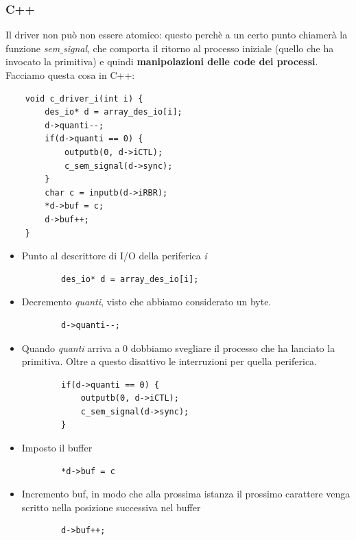 \subsubsection{C++} Il driver non può non essere atomico: questo perchè a un certo punto chiamerà la funzione \emph{sem$\_$signal}, che comporta il ritorno al processo iniziale (quello che ha invocato la primitiva) e quindi \textbf{manipolazioni delle code dei processi}. Facciamo questa cosa in C++:
\begin{verbatim}
	void c_driver_i(int i) {
		des_io* d = array_des_io[i];	
		d->quanti--;
		if(d->quanti == 0) {
			outputb(0, d->iCTL);
			c_sem_signal(d->sync);    
		}
		char c = inputb(d->iRBR);
		*d->buf = c;
		d->buf++;
	}
\end{verbatim}
\begin{itemize}
	\item Punto al descrittore di I/O della periferica \emph{i}
	\begin{verbatim}
		des_io* d = array_des_io[i]; 
	\end{verbatim}
	\item Decremento \emph{quanti}, visto che abbiamo considerato un byte.\begin{verbatim}
		d->quanti--;
	\end{verbatim}
	\item Quando \emph{quanti} arriva a $0$ dobbiamo svegliare il processo che ha lanciato la primitiva. Oltre a questo disattivo le interruzioni per quella periferica.
	\begin{verbatim}
		if(d->quanti == 0) {
			outputb(0, d->iCTL);
			c_sem_signal(d->sync);    
		}
	\end{verbatim}
	\item Imposto il buffer
	\begin{verbatim}
		*d->buf = c
	\end{verbatim}
	\item Incremento buf, in modo che alla prossima istanza il prossimo carattere venga scritto nella posizione successiva nel buffer
	\begin{verbatim}
		d->buf++;
	\end{verbatim}
\end{itemize}
